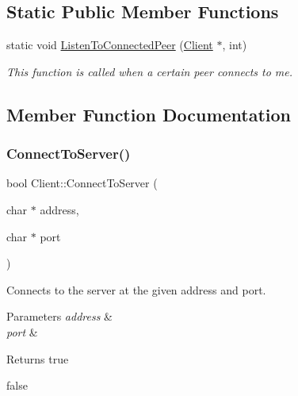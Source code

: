 \subsection*{Static Public Member Functions}
\begin{DoxyCompactItemize}
\item 
static void \mbox{\hyperlink{class_client_ab94c5088dc0e8924cd2803cfea1baed6}{Listen\+To\+Connected\+Peer}} (\mbox{\hyperlink{class_client}{Client}} $\ast$, int)
\begin{DoxyCompactList}\small\item\em This function is called when a certain peer connects to me. \end{DoxyCompactList}\end{DoxyCompactItemize}


\subsection{Member Function Documentation}
\mbox{\label{class_client_a26c0b389de6fe436880792e53a839520}} 
\subsubsection{\texorpdfstring{Connect\+To\+Server()}{ConnectToServer()}}
{\footnotesize\ttfamily bool Client\+::\+Connect\+To\+Server (\begin{DoxyParamCaption}\item[{char $\ast$}]{address,  }\item[{char $\ast$}]{port }\end{DoxyParamCaption})}



Connects to the server at the given address and port. 


\begin{DoxyParams}{Parameters}
{\em address} & \\
\hline
{\em port} & \\
\hline
\end{DoxyParams}
\begin{DoxyReturn}{Returns}
true 

false 
\end{DoxyReturn}
\mbox{\label{class_client_aa25ebf4ae857f69835c281513fa5f173}} 
